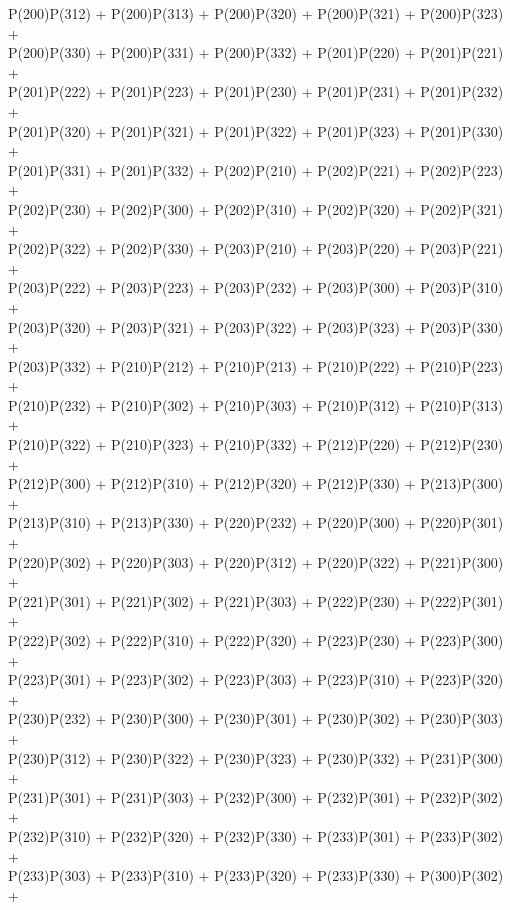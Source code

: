 P(200)P(312) + P(200)P(313) + P(200)P(320) + P(200)P(321) + P(200)P(323) +\\
P(200)P(330) + P(200)P(331) + P(200)P(332) + P(201)P(220) + P(201)P(221) +\\
P(201)P(222) + P(201)P(223) + P(201)P(230) + P(201)P(231) + P(201)P(232) +\\
P(201)P(320) + P(201)P(321) + P(201)P(322) + P(201)P(323) + P(201)P(330) +\\
P(201)P(331) + P(201)P(332) + P(202)P(210) + P(202)P(221) + P(202)P(223) +\\
P(202)P(230) + P(202)P(300) + P(202)P(310) + P(202)P(320) + P(202)P(321) +\\
P(202)P(322) + P(202)P(330) + P(203)P(210) + P(203)P(220) + P(203)P(221) +\\
P(203)P(222) + P(203)P(223) + P(203)P(232) + P(203)P(300) + P(203)P(310) +\\
P(203)P(320) + P(203)P(321) + P(203)P(322) + P(203)P(323) + P(203)P(330) +\\
P(203)P(332) + P(210)P(212) + P(210)P(213) + P(210)P(222) + P(210)P(223) +\\
P(210)P(232) + P(210)P(302) + P(210)P(303) + P(210)P(312) + P(210)P(313) +\\
P(210)P(322) + P(210)P(323) + P(210)P(332) + P(212)P(220) + P(212)P(230) +\\
P(212)P(300) + P(212)P(310) + P(212)P(320) + P(212)P(330) + P(213)P(300) +\\
P(213)P(310) + P(213)P(330) + P(220)P(232) + P(220)P(300) + P(220)P(301) +\\
P(220)P(302) + P(220)P(303) + P(220)P(312) + P(220)P(322) + P(221)P(300) +\\
P(221)P(301) + P(221)P(302) + P(221)P(303) + P(222)P(230) + P(222)P(301) +\\
P(222)P(302) + P(222)P(310) + P(222)P(320) + P(223)P(230) + P(223)P(300) +\\
P(223)P(301) + P(223)P(302) + P(223)P(303) + P(223)P(310) + P(223)P(320) +\\
P(230)P(232) + P(230)P(300) + P(230)P(301) + P(230)P(302) + P(230)P(303) +\\
P(230)P(312) + P(230)P(322) + P(230)P(323) + P(230)P(332) + P(231)P(300) +\\
P(231)P(301) + P(231)P(303) + P(232)P(300) + P(232)P(301) + P(232)P(302) +\\
P(232)P(310) + P(232)P(320) + P(232)P(330) + P(233)P(301) + P(233)P(302) +\\
P(233)P(303) + P(233)P(310) + P(233)P(320) + P(233)P(330) + P(300)P(302) +\\
